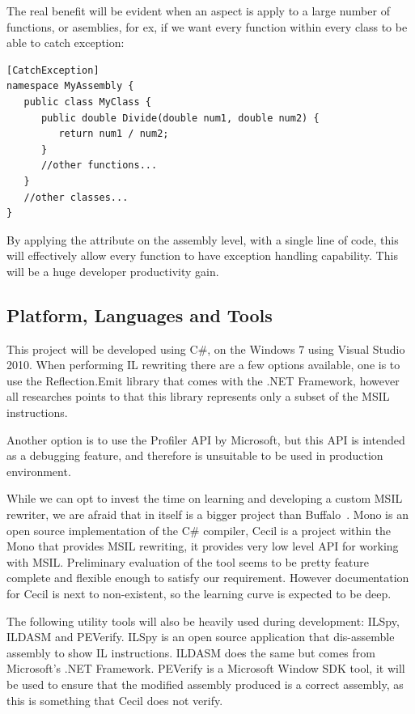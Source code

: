 The real benefit will be evident when an aspect is apply to a large number of functions, or asemblies, for ex, if we want every function within every class to be able to catch exception:

\begin{lstlisting}[caption={applying Buffalo aspect on an assembly}, label=applybuffaloassembly]
[CatchException]
namespace MyAssembly {
   public class MyClass {
      public double Divide(double num1, double num2) {
         return num1 / num2;
      }
      //other functions...
   }
   //other classes...
}
\end{lstlisting}

By applying the attribute on the assembly level, with a single line of code, this will effectively allow every function to have exception handling capability. This will be a huge developer productivity gain.

\subsection{Platform, Languages and Tools}
This project will be developed using C\#, on the Windows 7 using Visual Studio 2010. When performing IL rewriting there are a few options available, one is to use the Reflection.Emit library that comes with the .NET Framework, however all researches points to that this library represents only a subset of the MSIL instructions.

Another option is to use the Profiler API by Microsoft, but this API is intended as a debugging feature, and therefore is unsuitable to be used in production environment.

While we can opt to invest the time on learning and developing a custom MSIL rewriter, we are afraid that in itself is a bigger project than Buffalo~\cite{msil_text}. Mono is an open source implementation of the C\# compiler, Cecil is a project within the Mono that provides MSIL rewriting, it provides very low level API for working with MSIL. Preliminary evaluation of the tool seems to be pretty feature complete and flexible enough to satisfy our requirement. However documentation for Cecil is next to non-existent, so the learning curve is expected to be deep.

The following utility tools will also be heavily used during development: ILSpy, ILDASM and PEVerify. ILSpy is an open source application that dis-assemble assembly to show IL instructions. ILDASM does the same but comes from Microsoft’s .NET Framework. PEVerify is a Microsoft Window SDK tool, it will be used to ensure that the modified assembly produced is a correct assembly, as this is something that Cecil does not verify.


